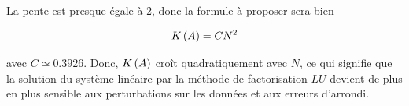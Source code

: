 \begin{enumerate}[label=\alph*)]
      La pente est presque égale à 2, donc la formule à proposer sera bien
      
      \begin{equation*}
        K \left(A\right) = C N^{2}
      \end{equation*}
      
       avec $C \simeq 0.3926$.
       Donc, $K \left(A\right)$ croît quadratiquement avec $N$, ce qui signifie que la solution du système linéaire par la méthode de factorisation $LU$ devient de plus en plus sensible aux perturbations sur les données et aux erreurs d'arrondi.

  


         
         
         
  
  
\end{enumerate}